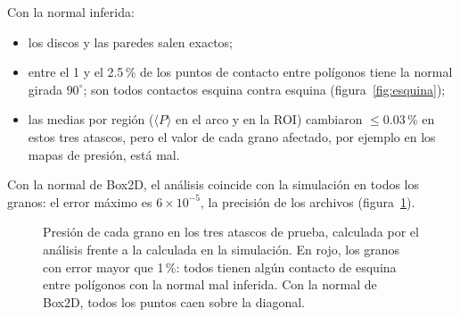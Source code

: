 \documentclass[11pt,a4paper]{article}
\newcommand{\ave}[1]{\langle #1 \rangle}
\begin{document}
Con la normal inferida:
\begin{itemize}
  \item los discos y las paredes salen exactos;
  \item entre el 1 y el 2.5\,\% de los puntos de contacto entre
    polígonos tiene la normal girada $90^\circ$; son todos contactos esquina contra
    esquina (figura~\ref{fig:esquina});
  \item las medias por región ($\ave{P}$ en el arco y en la ROI)
    cambiaron $\le 0.03$\,\% en estos tres atascos, pero el valor de
    cada grano afectado, por ejemplo en los mapas de presión, está mal.
\end{itemize}
Con la normal de Box2D, el análisis coincide con la simulación en todos
los granos: el error máximo es $6\times10^{-5}$, la precisión de los
archivos (figura~\ref{fig:comparacion}).

\begin{figure}[htbp]
\centering
{}
\caption{Presión de cada grano en los tres atascos de prueba, calculada
  por el análisis frente a la calculada en la simulación. En rojo, los
  granos con error mayor que 1\,\%: todos tienen algún contacto de
  esquina entre polígonos con la normal mal inferida. Con la normal de Box2D,
  todos los puntos caen sobre la diagonal.}
\label{fig:comparacion}
\end{figure}
\end{document}
